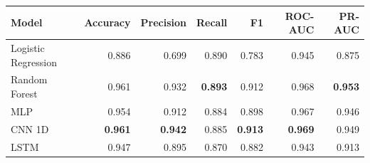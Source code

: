 \begin{tabular}{lrrrrrr}
\toprule
Model & Accuracy & Precision & Recall & F1 & ROC-AUC & PR-AUC \\
\midrule
Logistic Regression & 0.886 & 0.699 & 0.890 & 0.783 & 0.945 & 0.875 \\
Random Forest & 0.961 & 0.932 & \textbf{0.893} & 0.912 & 0.968 & \textbf{0.953} \\
MLP & 0.954 & 0.912 & 0.884 & 0.898 & 0.967 & 0.946 \\
CNN 1D & \textbf{0.961} & \textbf{0.942} & 0.885 & \textbf{0.913} & \textbf{0.969} & 0.949 \\
LSTM & 0.947 & 0.895 & 0.870 & 0.882 & 0.943 & 0.913 \\
\bottomrule
\end{tabular}